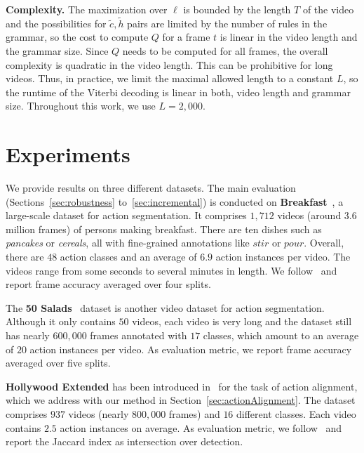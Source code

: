\documentclass[10pt,twocolumn,letterpaper]{article}
\begin{document}
\textbf{Complexity.}
The maximization over $ \ell $ is bounded by the length
$ T $ of the video and the possibilities for $ \tilde c, \tilde h $ pairs are limited
by the number of rules in the grammar, so the cost to compute $ Q $ for a frame $ t $
is linear in the video length and the grammar size. Since $ Q $ needs to be computed for
all frames, the overall complexity is quadratic in the video length. This can
be prohibitive for long videos. Thus, in practice, we limit the maximal allowed length to
a constant $ L $, so the runtime of the Viterbi decoding is linear in both, video length
and grammar size. Throughout this work, we use $ L = 2,000 $.




\section{Experiments}
\label{sec:experiments}



We provide results on three different datasets. The main evaluation (Sections~\ref{sec:robustness} to~\ref{sec:incremental}) is conducted on
\textbf{Breakfast}~\cite{kuehne14language}, a large-scale dataset for action segmentation.
It comprises $ 1,712 $ videos (around $ 3.6 $ million frames) of persons making breakfast.
There are ten dishes such as \textit{pancakes} or \textit{cereals}, all with fine-grained
annotations like $ \textit{stir} $ or $ \textit{pour} $. Overall, there are $ 48 $ action
classes and an average of $ 6.9 $ action instances per video. The videos
range from some seconds to several minutes in length. We follow~\cite{kuehne14language} and
report frame accuracy averaged over four splits.

The \textbf{50 Salads}~\cite{stein2013combining} dataset is another video dataset for action segmentation. Although
it only contains $ 50 $ videos, each video is very long and the dataset still has nearly
$ 600,000 $ frames annotated with $ 17 $ classes, which amount to an average of $ 20 $
action instances per video. As evaluation metric, we report frame accuracy averaged
over five splits.

\textbf{Hollywood Extended} has been introduced in~\cite{bojanowski14weakly} for the
task of action alignment, which we address with our method in Section~\ref{sec:actionAlignment}.
The dataset comprises $ 937 $ videos (nearly $ 800,000 $ frames) and $ 16 $ different classes. Each video
contains $ 2.5 $ action instances on average. As evaluation metric, we follow~\cite{bojanowski14weakly}
and report the Jaccard index as intersection over detection.
\end{document}
